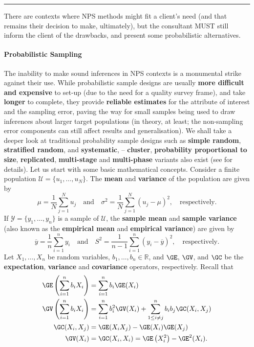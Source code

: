 \begin{center}
    \rule{0.5\textwidth}{.4pt}
\end{center}
There are contexts where NPS methods might fit a client's need (and that remains their decision to make, ultimately), but the consultant MUST still inform the client of the drawbacks, and present some  probabilistic alternatives.  
\paragraph{Probabilistic Sampling}
The inability to make sound inferences in NPS contexts is a monumental strike against their use. While probabilistic sample designs are usually \textbf{more difficult and expensive} to set-up (due to the need for a quality survey frame), and take \textbf{longer} to complete, they provide \textbf{reliable estimates} for the attribute of interest and the sampling error, paving the way for  small samples being used to draw inferences about  larger target populations (in theory, at least; the non-sampling error components can still affect results and generalisation). \newl We shall take a deeper look at traditional probability sample designs such as \textbf{simple random}, \textbf{stratified random}, and \textbf{systematic},   -- \textbf{cluster}, \textbf{probability proportional to size}, \textbf{replicated}, \textbf{multi-stage} and \textbf{multi-phase} variants also exist (see \cite{DC_F,DC_SC} for details).\newl
Let us start with some basic mathematical concepts. Consider a finite population $\mathcal{U}=\{u_1,\ldots,u_N\}$. The \textbf{mean} and \textbf{variance} of the population are given by 
$$\mu=\frac{1}{N}\sum_{j=1}^Nu_j\quad\mbox{and}\quad \sigma^2=\frac{1}{N}\sum_{j=1}^N(u_j-\mu)^2, \quad\mbox{respectively.}$$ If $\mathcal{Y}=\{y_1,\ldots,y_n\}$ is a sample of $\mathcal{U}$, the \textbf{sample mean} and \textbf{sample variance} (also known as the \textbf{empirical mean} and \textbf{empirical variance}) are given by 
$$\overline{y}=\frac{1}{n}\sum_{i=1}^ny_i\quad\mbox{and}\quad S^2=\frac{1}{n-1}\sum_{i=1}^n(y_i-\overline{y})^2, \quad\mbox{respectively.}$$ Let $X_1,\ldots,X_n$ be random variables, $b_1,\ldots,b_n\in \mathbb{R}$, and $\GE$, $\GV$, and $\GC$ be the \textbf{expectation}, \textbf{variance} and \textbf{covariance} operators, respectively. Recall that 
\begin{align*}
    \GE \left(\sum_{i=1}^nb_iX_i\right) &=\sum_{i=1}^nb_i\GE(X_i) \\
    \GV\left(\sum_{i=1}^nb_iX_i\right)&=\sum_{i=1}^n b_i^2\GV(X_i)+\sum_{1\leq i\neq j}^nb_ib_j\GC(X_i,X_j) \\
\GC(X_i,X_j)&=\GE(X_iX_j)-\GE(X_i)\GE(X_j)\\
\GV(X_i)&=\GC(X_i,X_i)=\GE\left(X_i^2\right)-\GE^2(X_i).
\end{align*}
